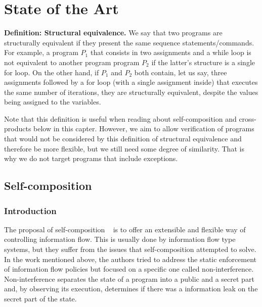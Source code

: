 
%

\makeatletter
\newcommand{\ntifpkgloaded}{%
  \@ifpackageloaded%
}
\makeatother


\chapter{State of the Art}
\label{cha:state_of_the_art}

\textbf{Definition: Structural equivalence.} We say that two programs are structurally equivalent if they present the same sequence statements/commands.
For example, a program \emph{$P_1$} that consists in two assignments and a while loop is not equivalent to another program program \emph{$P_2$} if the latter's structure is a single for loop.
On the other hand, if \emph{$P_1$} and \emph{$P_2$} both contain, let us say, three assignments followed by a for loop (with a single assignment inside) that executes the same number of iterations, they are structurally equivalent, despite the values being assigned to the variables.

Note that this definition is useful when reading about self-composition and cross-products below in this capter.
However, we aim to allow verification of programs that would not be considered by this definition of structural equivalence and therefore be more flexible, but we still need some degree of similarity.
That is why we do not target programs that include exceptions.


\section{Self-composition} 
\label{sec:self_composition}

\subsection{Introduction}
\label{subsec:self_composition_intro}

The proposal of self-composition ~\cite{DBLP:conf/csfw/BartheDR04} is to offer an extensible and flexible way of controlling information flow.
This is usually done by information flow type systems, but they suffer from the issues that self-composition attempted to solve.
In the work mentioned above, the authors tried to address the static enforcement of information flow policies but focused on a specific one called non-interference.
Non-interference separates the state of a program into a public and a secret part and, by observing its execution, determines if there was a information leak on the secret part of the state.

